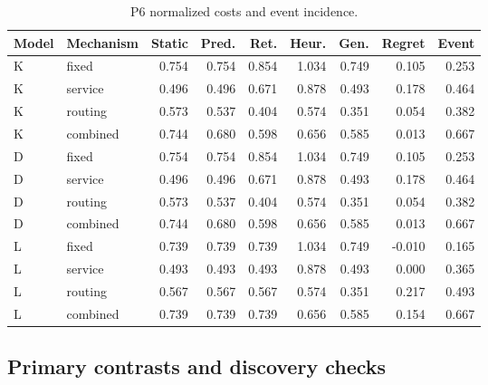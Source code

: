 \begin{table}[htbp]\caption{P6 normalized costs and event incidence.}\centering\small\setlength{\tabcolsep}{3pt}

\begin{tabular}{llrrrrrrr}\toprule

Model & Mechanism & Static & Pred. & Ret. & Heur. & Gen. & Regret & Event\\\midrule

K & fixed & 0.754 & 0.754 & 0.854 & 1.034 & 0.749 & 0.105 & 0.253\\

K & service & 0.496 & 0.496 & 0.671 & 0.878 & 0.493 & 0.178 & 0.464\\

K & routing & 0.573 & 0.537 & 0.404 & 0.574 & 0.351 & 0.054 & 0.382\\

K & combined & 0.744 & 0.680 & 0.598 & 0.656 & 0.585 & 0.013 & 0.667\\

D & fixed & 0.754 & 0.754 & 0.854 & 1.034 & 0.749 & 0.105 & 0.253\\

D & service & 0.496 & 0.496 & 0.671 & 0.878 & 0.493 & 0.178 & 0.464\\

D & routing & 0.573 & 0.537 & 0.404 & 0.574 & 0.351 & 0.054 & 0.382\\

D & combined & 0.744 & 0.680 & 0.598 & 0.656 & 0.585 & 0.013 & 0.667\\

L & fixed & 0.739 & 0.739 & 0.739 & 1.034 & 0.749 & -0.010 & 0.165\\

L & service & 0.493 & 0.493 & 0.493 & 0.878 & 0.493 & 0.000 & 0.365\\

L & routing & 0.567 & 0.567 & 0.567 & 0.574 & 0.351 & 0.217 & 0.493\\

L & combined & 0.739 & 0.739 & 0.739 & 0.656 & 0.585 & 0.154 & 0.667\\

\bottomrule\end{tabular}\end{table}

\clearpage

\subsection{Primary contrasts and discovery checks}

